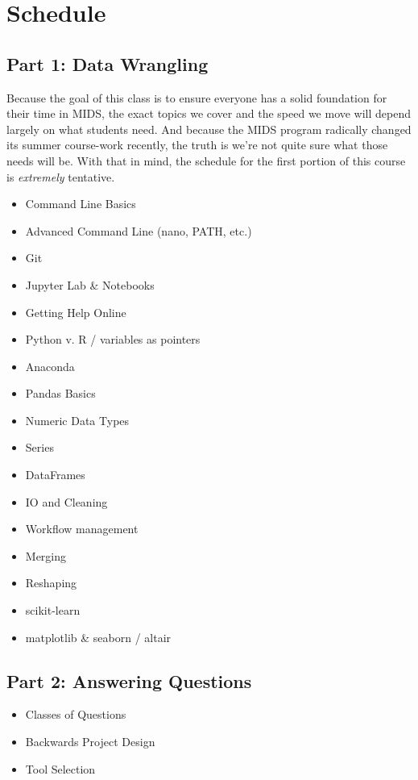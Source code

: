 \documentclass[12pt]{article}
\begin{document}
\section{Schedule}

\subsection{Part 1: Data Wrangling}

Because the goal of this class is to ensure everyone has a solid foundation for their time in MIDS, the exact topics we cover and the speed we move will depend largely on what students need. And because the MIDS program radically changed its summer course-work recently, the truth is we're not quite sure what those needs will be. With that in mind, the schedule for the first portion of this course is \emph{extremely} tentative.

\begin{itemize}
	\item Command Line Basics
	\item Advanced Command Line  (nano, PATH, etc.)
	\item Git
	\item Jupyter Lab \& Notebooks
	\item Getting Help Online
	\item Python v. R / variables as pointers
	\item Anaconda
	\item Pandas Basics
	\item Numeric Data Types
	\item Series
	\item DataFrames
	\item IO and Cleaning
	\item Workflow management
	\item Merging
	\item Reshaping
	\item scikit-learn
	\item matplotlib \& seaborn / altair
\end{itemize}


\subsection{Part 2: Answering Questions}

\begin{itemize}
	\item Classes of Questions
	\item Backwards Project Design
	\item Tool Selection
\end{itemize}
\end{document}
